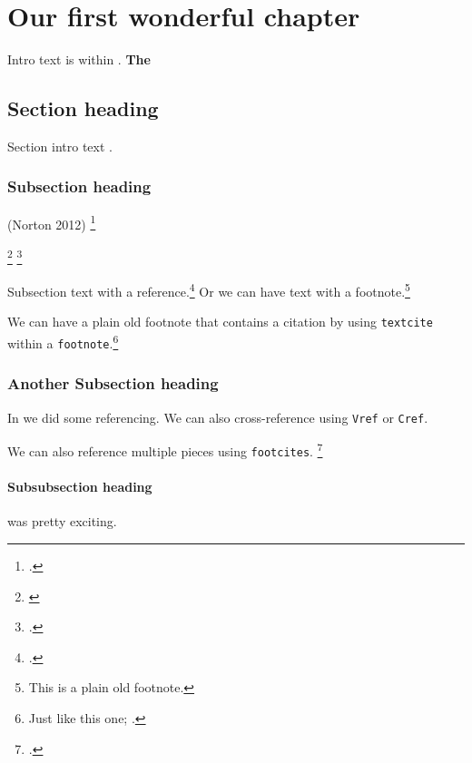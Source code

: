 \chapter{Our first wonderful chapter}\label{chap:Chap1}

    Intro text is within . \textbf{The } 
    
\section{Section heading}\label{sec:newssec}

    Section intro text .

\subsection{Subsection heading}\label{sec:above}
(Norton 2012) \footcite{Norton2012}
    \textcite{Norton2012}
    
    \footnote{\textcite{Norton2017b}}
    \footcite[test][2-10]{Norton2017c}


    Subsection text with a reference.\footcite[][2-10]{Gore2017a} Or we can have text with a footnote.\footnote{This is a plain old footnote.}
    
    We can have a plain old footnote that contains a citation by using \texttt{textcite} within a \texttt{footnote}.\footnote{Just like this one; \textcite{Norton2018d}.}


\subsection{Another Subsection heading}\label{sec:another}

    In  we did some referencing. We can also cross-reference using \texttt{Vref} or \texttt{Cref}. 
    
    We can also reference multiple pieces using \texttt{footcites}. \footcites[][]{Gore2017a}[][]{Gore2017b}[][51]{RoyMorganResearch2009} 


\subsubsection{Subsubsection heading}

     was pretty exciting.


